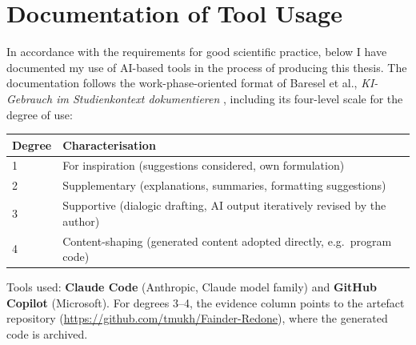 \newpage

\section*{Documentation of Tool Usage}

In accordance with the requirements for good scientific practice, below I have documented my use of AI-based tools in the process of producing this thesis. The documentation follows the work-phase-oriented format of Baresel et al., \emph{KI-Gebrauch im Studienkontext dokumentieren} \cite{baresel_2024}, including its four-level scale for the degree of use:

\begin{center}
\footnotesize
\begin{tabular}{lp{10.5cm}}
\hline
\textbf{Degree} & \textbf{Characterisation} \\
\hline
1 & For inspiration (suggestions considered, own formulation) \\
2 & Supplementary (explanations, summaries, formatting suggestions) \\
3 & Supportive (dialogic drafting, AI output iteratively revised by the author) \\
4 & Content-shaping (generated content adopted directly, e.g.\ program code) \\
\hline
\end{tabular}
\end{center}

\vspace{0.3cm}

\noindent Tools used: \textbf{Claude Code} (Anthropic, Claude model family) and \textbf{GitHub Copilot} (Microsoft). For degrees 3--4, the evidence column points to the artefact repository (\url{https://github.com/tmukh/Fainder-Redone}), where the generated code is archived.

\vspace{0.3cm}

